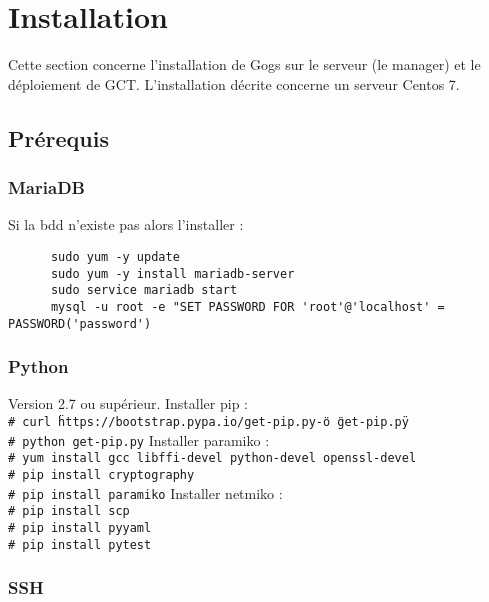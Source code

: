 \documentclass{article}
\newcommand{\shellcmdd}[1]{\\\indent\indent\texttt{\footnotesize\# #1}}
\begin{document}
  \section{Installation}

    Cette section concerne l'installation de Gogs sur le serveur (le manager) et le déploiement de GCT.
    L'installation décrite concerne un serveur Centos 7.

    \subsection{Prérequis}
      \subsubsection{MariaDB}

      Si la bdd n'existe pas alors l'installer :
\begin{verbatim}
      sudo yum -y update
      sudo yum -y install mariadb-server
      sudo service mariadb start
      mysql -u root -e "SET PASSWORD FOR 'root'@'localhost' = PASSWORD('password')
\end{verbatim}

      \subsubsection{Python}

      Version 2.7 ou supérieur. \bigbreak
      \noindent Installer pip :
      \noindent\shellcmdd{curl \"https://bootstrap.pypa.io/get-pip.py\" -o \"get-pip.py\"}
      \noindent\shellcmdd{python get-pip.py} \smallbreak
      \noindent Installer paramiko :
      \noindent\shellcmdd{yum install gcc libffi-devel python-devel openssl-devel}
      \noindent\shellcmdd{pip install cryptography}
      \noindent\shellcmdd{pip install paramiko} \smallbreak
      \noindent Installer netmiko :
      \noindent\shellcmdd{pip install scp}
      \noindent\shellcmdd{pip install pyyaml}
      \noindent\shellcmdd{pip install pytest}

    \subsubsection{SSH}
\end{document}
